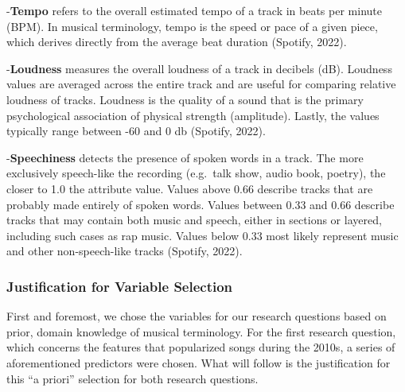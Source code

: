 \documentclass[
]{article}
\begin{document}
-\textbf{Tempo} refers to the overall estimated tempo of a track in
beats per minute (BPM). In musical terminology, tempo is the speed or
pace of a given piece, which derives directly from the average beat
duration (Spotify, 2022).

-\textbf{Loudness} measures the overall loudness of a track in decibels
(dB). Loudness values are averaged across the entire track and are
useful for comparing relative loudness of tracks. Loudness is the
quality of a sound that is the primary psychological association of
physical strength (amplitude). Lastly, the values typically range
between -60 and 0 db (Spotify, 2022).

-\textbf{Speechiness} detects the presence of spoken words in a track.
The more exclusively speech-like the recording (e.g.~talk show, audio
book, poetry), the closer to 1.0 the attribute value. Values above 0.66
describe tracks that are probably made entirely of spoken words. Values
between 0.33 and 0.66 describe tracks that may contain both music and
speech, either in sections or layered, including such cases as rap
music. Values below 0.33 most likely represent music and other
non-speech-like tracks (Spotify, 2022).

\hypertarget{justification-for-variable-selection}{%
\subsubsection{Justification for Variable
Selection}\label{justification-for-variable-selection}}

First and foremost, we chose the variables for our research questions
based on prior, domain knowledge of musical terminology. For the first
research question, which concerns the features that popularized songs
during the 2010s, a series of aforementioned predictors were chosen.
What will follow is the justification for this ``a priori'' selection
for both research questions.
\end{document}
